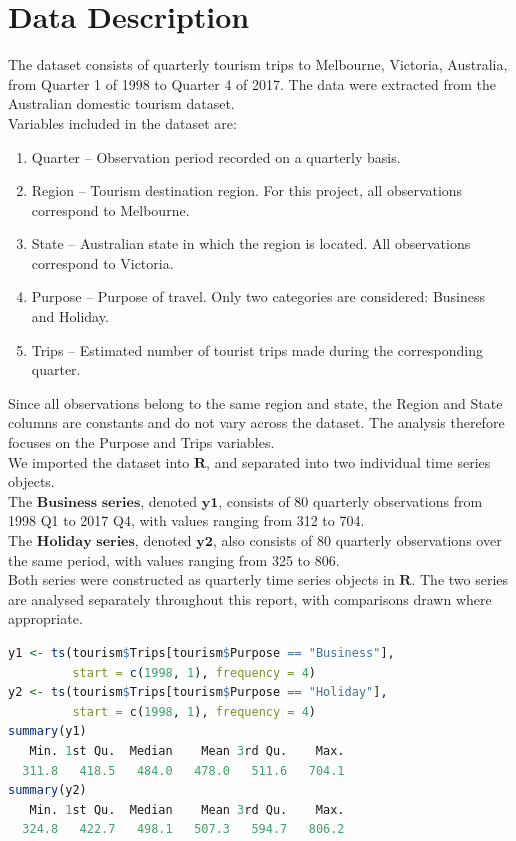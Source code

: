 \section{Data Description}
The dataset consists of quarterly tourism trips to Melbourne, Victoria, Australia, from Quarter 1 of
1998 to Quarter 4 of 2017. The data were extracted from the Australian domestic tourism dataset.\\
Variables included in the dataset are:
\begin{enumerate}
    \item Quarter – Observation period recorded on a quarterly basis.
    \item Region – Tourism destination region. For this project, all observations correspond to Melbourne.
    \item State – Australian state in which the region is located. All observations correspond to Victoria.
    \item Purpose – Purpose of travel. Only two categories are considered: Business
and Holiday.
\item Trips – Estimated number of tourist trips made during the corresponding quarter.
\end{enumerate}

\noindent Since all observations belong to the same region and state, the Region and State columns are constants and do not vary across the dataset. The analysis therefore focuses on the Purpose and Trips variables. \\
We imported the dataset into $\mathbf{R}$, and separated into two individual time series objects.\\
The $\textbf{Business series}$, denoted $\textbf{y1}$, consists of 80 quarterly observations from 1998 Q1 to 2017 Q4, with values ranging from 312 to 704.\\
The $\textbf{Holiday series}$, denoted $\textbf{y2}$, also consists of 80 quarterly observations over the same period, with values ranging from 325 to 806.\\
Both series were constructed as quarterly time series objects in $\mathbf{R}$. The two series are analysed separately throughout this report, with comparisons drawn where appropriate.\\

\begin{lstlisting}[language=R]
y1 <- ts(tourism$Trips[tourism$Purpose == "Business"], 
         start = c(1998, 1), frequency = 4)
y2 <- ts(tourism$Trips[tourism$Purpose == "Holiday"], 
         start = c(1998, 1), frequency = 4)
summary(y1)
   Min. 1st Qu.  Median    Mean 3rd Qu.    Max. 
  311.8   418.5   484.0   478.0   511.6   704.1 
summary(y2)
   Min. 1st Qu.  Median    Mean 3rd Qu.    Max. 
  324.8   422.7   498.1   507.3   594.7   806.2 
\end{lstlisting}